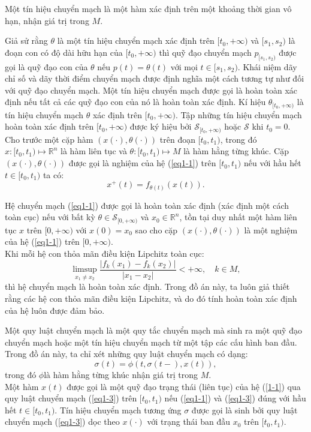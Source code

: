 \documentclass[14pt,a4paper,oneside]{report}		%
\begin{document}
Một tín hiệu chuyển mạch là một hàm xác định trên một khoảng thời gian vô hạn, nhận giá trị trong $M$.

Giả sử rằng $\theta$ là một tín hiệu chuyển mạch xác định trên $[t_0,+\infty)$ và $[s_1,s_2)$ là đoạn con có độ dài hữu hạn của $[t_0,+\infty)$ thì quỹ đạo chuyển mạch $p_{[s_1,s_2)}$ được gọi là quỹ đạo con của $\theta$ nếu $p(t)=\theta(t)$ với mọi $t\in[s_1,s_2)$. Khái niệm dãy chỉ số và dãy thời điểm chuyển mạch được định nghĩa một cách tương tự như đối với quỹ đạo chuyển mạch.
Một tín hiệu chuyển mạch được gọi là hoàn toàn xác định nếu tất cả các quỹ đạo con của nó là hoàn toàn xác định. Kí hiệu $\theta_{[t_0,+\infty)}$ là tín hiệu chuyển mạch $\theta$ xác định trên $[t_0,+\infty)$. Tập những tín hiệu chuyển mạch hoàn toàn xác định trên $[t_0,+\infty)$ được ký hiệu bởi $\mathcal{S}_{[t_0,+\infty)}$ hoặc $\mathcal{S}$ khi $t_0=0$.\\

Cho trước một cặp hàm $(x(\cdot),\theta(\cdot))$ trên đoạn $[t_0,t_1)$, trong đó $x:[t_0,t_1)\mapsto\mathbb{R}^n$ là hàm liên tục và $\theta:[t_0,t_1)\mapsto M$ là hàm hằng từng khúc. Cặp $(x(\cdot),\theta(\cdot))$ được gọi là nghiệm của hệ (\ref{eq1-1}) trên $[t_0,t_1)$ nếu với hầu hết $t\in [t_0,t_1)$ ta có:
$$x^+(t)=f_{\theta(t)}(x(t)).$$

Hệ chuyển mạch (\ref{eq1-1}) được gọi là hoàn toàn xác định (xác định một cách toàn cục) nếu với bất kỳ $\theta\in\mathcal{S}_{[0,+\infty)}$ và $x_0\in\mathbb{R}^n$, tồn tại duy nhất một hàm liên tục $x$ trên $[0,+\infty)$ với $x(0)=x_0$ sao cho cặp $(x(\cdot),\theta(\cdot))$ là một nghiệm của hệ (\ref{eq1-1}) trên $[0,+\infty)$.\\
Khi mỗi hệ con thỏa mãn điều kiện Lipchitz toàn cục:
$$\limsup_{x_1\neq x_2}\frac{|f_k(x_1)-f_k(x_2)|}{|x_1-x_2|} < +\infty,\quad k\in M,$$
thì hệ chuyển mạch là hoàn toàn xác định. Trong đồ án này, ta luôn giả thiết rằng các hệ con thỏa mãn điều kiện Lipchitz, và do đó tính hoàn toàn xác định của hệ luôn được đảm bảo.

Một quy luật chuyển mạch là một quy tắc chuyển mạch mà sinh ra một quỹ đạo chuyển mạch hoặc một tín hiệu chuyển mạch từ một tập các cấu hình ban đầu. Trong đồ án này, ta chỉ xét những quy luật chuyển mạch có dạng:
\begin{equation} \label{eq1-3}
\sigma(t)=\phi(t,\sigma(t-),x(t)),
\end{equation} 
trong đó $\phi$là hàm hằng từng khúc nhận giá trị trong $M$.\\
Một hàm $x(t)$ được gọi là một quỹ đạo trạng thái (liên tục) của hệ (\ref{1-1}) qua quy luật chuyển mạch (\ref{eq1-3}) trên $[t_0,t_1)$ nếu (\ref{eq1-1}) và (\ref{eq1-3}) đúng với hầu hết $t\in[t_0,t_1)$. Tín hiệu chuyển mạch tương ứng $\sigma$ được gọi là sinh bởi quy luật chuyển mạch (\ref{eq1-3}) dọc theo $x(\cdot)$ với trạng thái ban đầu $x_0$ trên $[t_0,t_1)$.
\end{document}
